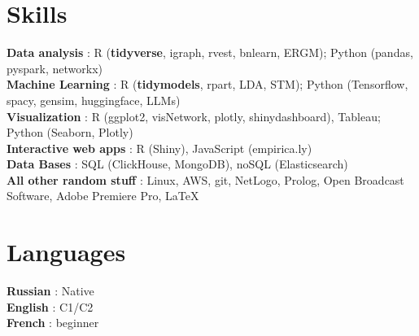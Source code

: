 \documentclass[letterpaper,11pt]{article}
\begin{document}
\section{Skills}
 \begin{itemize}[leftmargin=0in, label={}]
    \small{\item{
     \textbf{Data analysis} {: R (\textbf{tidyverse}, igraph, rvest, bnlearn, ERGM); Python (pandas, pyspark, networkx)} \vspace{2pt} \\
    \textbf{Machine Learning} {: R (\textbf{tidymodels}, rpart, LDA, STM); Python (Tensorflow, spacy, gensim, huggingface, LLMs)} \vspace{2pt} \\
    \textbf{Visualization} {: R (ggplot2, visNetwork, plotly, shinydashboard), Tableau;  Python (Seaborn, Plotly) } \vspace{2pt} \\
    \textbf{Interactive web apps} {: R (Shiny), JavaScript (empirica.ly)} \vspace{2pt} \\
    \textbf{Data Bases} {: SQL (ClickHouse, MongoDB), noSQL (Elasticsearch)} \vspace{2pt} \\
    \textbf{All other random stuff} {: Linux, AWS, git, NetLogo, Prolog, Open Broadcast Software, Adobe Premiere Pro, \LaTeX}
    }}
 \end{itemize}

\section{Languages}
 \begin{itemize}[leftmargin=0in, label={}]
    \small{\item{
     \textbf{Russian} {: Native} \vspace{2pt} \\
     \textbf{English} {: C1/C2} \vspace{2pt} \\
     \textbf{French} {: beginner} \vspace{2pt} \\
    }}
 \end{itemize}


\newrefcontext[labelprefix=P, sorting=ydnt]

\nocite{suschevskiy_creating_2021}
\nocite{musabirov_teaching_2020}
\nocite{marchenko_analysis_2018}
\nocite{suschevskiy_network_2018}

\printbibliography[filter=papers,title={Publications}]

\newrefcontext[labelprefix=C, sorting=ydnt]

\nocite{CODE2023}
\nocite{IC2S22023}
\nocite{HCID2022}
\nocite{Sunbelt2020}
\nocite{SIGCSE2020}
\nocite{ICCSS2019}


\printbibliography[filter=presentations,title={Conference presentations}]
\end{document}
